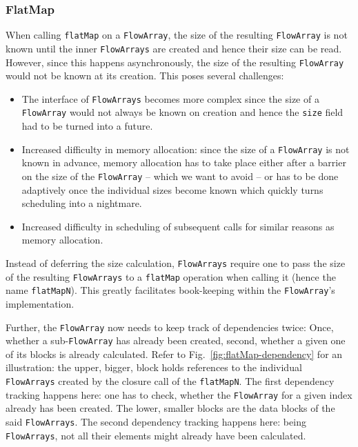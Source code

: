 \documentclass[runningheads,a4paper,fleqn]{llncs}
\begin{document}
\subsubsection{FlatMap}
\label{sssec:flatMapN}

When calling \texttt{flatMap} on a \texttt{FlowArray}, the size of the
resulting \texttt{FlowArray} is not known until the inner \texttt{FlowArrays} are
created and hence their size can be read. However, since this happens 
asynchronously, the size of the resulting \texttt{FlowArray} would not be known
at its creation. This poses several challenges:

\begin{itemize}
\item The interface of \texttt{FlowArrays} becomes more complex since the size
  of a \texttt{FlowArray} would not always be known on creation and hence the
  \texttt{size} field had to be turned into a future.
\item Increased difficulty in memory allocation: since the size of a
  \texttt{FlowArray} is not known in advance, memory allocation has to take
  place either after a barrier on the size of the \texttt{FlowArray} -- which
  we want to avoid -- or has to be done adaptively once the individual
  sizes become known which quickly turns scheduling into a
  nightmare. 
\item Increased difficulty in scheduling of subsequent calls for
  similar reasons as memory allocation.
\end{itemize}

Instead of deferring the size calculation, \texttt{FlowArrays} require
one to pass
the size of the resulting \texttt{FlowArrays} to a \texttt{flatMap}
operation 
when calling it (hence the name \texttt{flatMapN}). This greatly 
facilitates book-keeping within the \texttt{FlowArray}'s
implementation.

Further, the \texttt{FlowArray} now needs to keep track of dependencies twice:
Once, whether a sub-\texttt{FlowArray} has already been created, second,
whether a given one of its blocks is already calculated. Refer to
Fig.~\ref{fig:flatMap-dependency} for an illustration: the upper,
bigger, block holds references to the individual \texttt{FlowArrays} created by
the closure call of the \texttt{flatMapN}. The first dependency
tracking happens here: one has to check, whether the \texttt{FlowArray} for a
given index already has been created. The lower, smaller blocks are
the data blocks of the said \texttt{FlowArrays}. The second dependency tracking
happens here: being \texttt{FlowArrays}, not all their elements might already
have been calculated.
\end{document}
